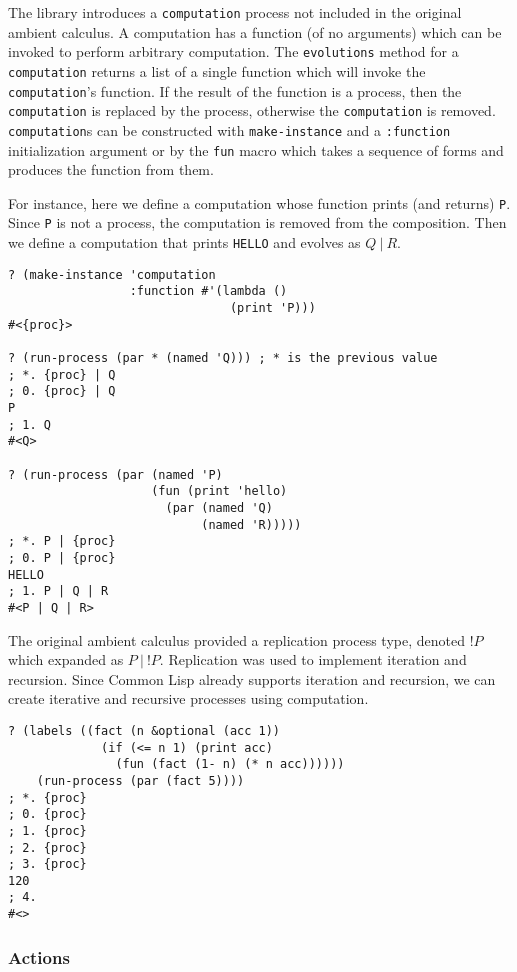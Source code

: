 \documentclass[12pt]{article}
\begin{document}
The library introduces a \texttt{computation} process not included in the original ambient calculus.
A computation has a function (of no arguments) which can be invoked to perform arbitrary computation.
The \texttt{evolutions} method for a \texttt{computation} returns a list of a single function which will invoke the \texttt{computation}'s function.
If the result of the function is a process, then the \texttt{computation} is replaced by the process, otherwise the \texttt{computation} is removed.
\texttt{computation}s can be constructed with \texttt{make-instance} and a \texttt{:function} initialization argument or by the \texttt{fun} macro which takes a sequence of forms and produces the function from them.

For instance, here we define a computation whose function prints (and returns) \texttt{P}.
Since \texttt{P} is not a process, the computation is removed from the composition.
Then we define a computation that prints \texttt{HELLO} and evolves as  $Q\ |\ R$.

\begin{verbatim}
? (make-instance 'computation
                 :function #'(lambda ()
                               (print 'P)))
#<{proc}>

? (run-process (par * (named 'Q))) ; * is the previous value
; *. {proc} | Q
; 0. {proc} | Q
P 
; 1. Q
#<Q>

? (run-process (par (named 'P) 
                    (fun (print 'hello)
                      (par (named 'Q)
                           (named 'R)))))
; *. P | {proc}
; 0. P | {proc}
HELLO 
; 1. P | Q | R
#<P | Q | R>
\end{verbatim}

The original ambient calculus provided a replication process type, denoted $!P$ which expanded as $P\ |\ !P$.
Replication was used to implement iteration and recursion.
Since Common Lisp already supports iteration and recursion, we can create iterative and recursive processes using computation.

\begin{verbatim}
? (labels ((fact (n &optional (acc 1))
             (if (<= n 1) (print acc)
               (fun (fact (1- n) (* n acc))))))
    (run-process (par (fact 5))))
; *. {proc}
; 0. {proc}
; 1. {proc}
; 2. {proc}
; 3. {proc}
120 
; 4. 
#<>
\end{verbatim}

\subsubsection{Actions}
\label{sec:actions}
\end{document}
